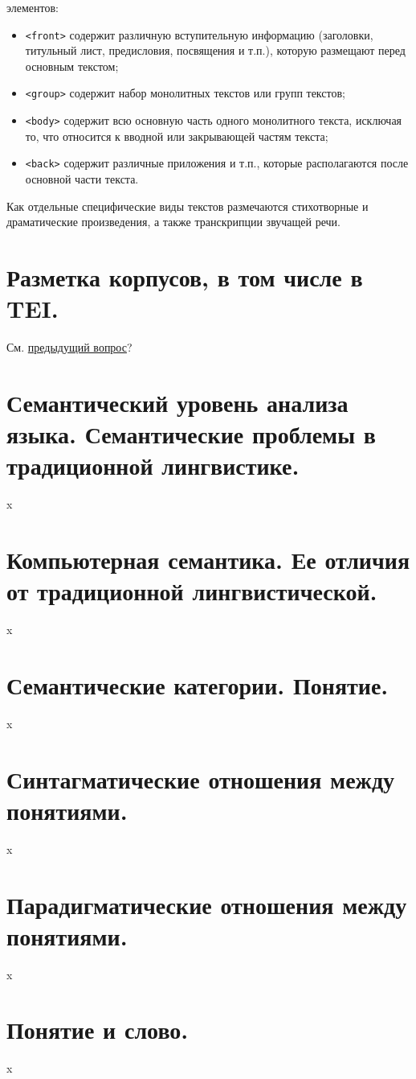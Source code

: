 \documentclass[12pt]{article}
\theoremstyle{definition}
\theoremstyle{remark}
\numberwithin{equation}{section}
\begin{document}
элементов:
\begin{itemize}
\item \texttt{<front>} содержит различную вступительную информацию (заголовки, титульный лист,
предисловия, посвящения и т.п.), которую размещают перед основным текстом;
\item \texttt{<group>} содержит набор монолитных текстов или групп текстов;
\item \texttt{<body>} содержит всю основную часть одного монолитного текста, исключая то, что
относится к вводной или закрывающей частям текста;
\item \texttt{<back>} содержит различные приложения и т.п., которые располагаются после основной
части текста.
\end{itemize}
Как отдельные специфические виды текстов размечаются стихотворные и драматические произведения, а также транскрипции звучащей речи.

\section{Разметка корпусов, в том числе в TEI.}

См. \hyperref[sec:TEI]{предыдущий вопрос}?

\section{Семантический уровень анализа языка. Семантические проблемы в традиционной лингвистике.}
x
\section{Компьютерная семантика. Ее отличия от традиционной лингвистической.}
x
\section{Семантические категории. Понятие.}
x
\section{Синтагматические отношения между понятиями.}
x
\section{Парадигматические отношения между понятиями.}
x
\section{Понятие и слово.}
x
\end{document}
